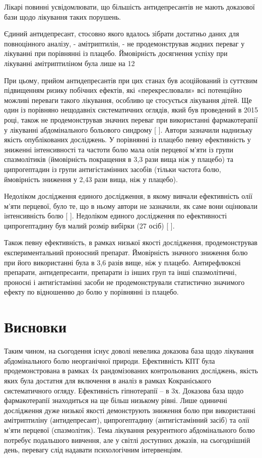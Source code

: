 \item Лікарі повинні усвідомлювати, що більшість антидепресантів не мають доказової бази щодо лікування таких порушень.
\item Єдиний антидепресант, стосовно якого вдалось зібрати достатньо даних для повноцінного аналізу, - амітриптилін, - не продемонстрував жодних переваг у лікуванні при порівнянні із плацебо. Ймовірність досягнення успіху при лікуванні амітриптиліном була лише на 12%
\item При цьому, прийом антидепресантів при цих станах був асоційований із суттєвим підвищенням ризику побічних ефектів, які «перекреслювали» всі потенційно можливі переваги такого лікування, особливо це стосується лікування дітей.
Ще один із порівняно нещодавніх систематичних оглядів, який був проведений в 2015 році, також не продемонстрував значних переваг при використанні фармакотерапії у лікуванні абдомінального больового синдрому [
]. Автори зазначили наднизьку якість опублікованих досліджень. У порівнянні із плацебо певну ефективність у зниженні інтенсивності та частоти болю мала олія перцевої м’яти із групи спазмолітиків (ймовірність покращення в 3,3 рази вища ніж у плацебо) та ципрогептадин із групи антигістамінних засобів (тільки частота болю, ймовірність зниження у 2,43 рази вища, ніж у плацебо). 

Недоліком дослідження единого дослідження, в якому вивчали ефективність олії м’яти перцевої, було те, що в ньому автори не зазначили, як саме вони оцінювали інтенсивність болю [
]. Недоліком единого дослідження по ефективності ципрогептадину був малий розмір вибірки (27 осіб) [
]. 

Також певну ефективність, в рамках низької якості дослідження, продемонстрував експериментальний проносний препарат. Ймовірність значного зниження болю при його використанні була в 3,6 разів вище, ніж у плацебо. Антирефлюксні препарати, антидепресанти, препарати із інших груп та інші спазмолітичні, проносні і антигістамінні засоби не продемонстрували статистично значимого ефекту по відношенню до болю у порівнянні із плацебо.

\section {Висновки}
Таким чином, на сьогодення існує доволі невелика доказова база щодо лікування абдомінального болю неорганічної природи. Ефективність КПТ була продемонстрована в рамках 4х рандомізованих контрольованих досліджень, якість яких була достатня для включення в аналіз в рамках Кокраніського систематичного огляду.  Ефективність гіпнотерапії – в 3х. Доказова база щодо фармакотерапії знаходиться на ще більш низькому рівні. Лише одиничні дослідження дуже низької якості демонструють зниження болю при використанні амітриптиліну (антидепресант), ципрогептадину (антигістамінний засіб) та олії м’яти перцевої (спазмолітик). Тема лікування рекурентного абдомінального болю потребує подальшого вивчення, але у світлі доступних доказів, на сьогоднішній день, перевагу слід надавати психологічним інтервенціям.
\par 

